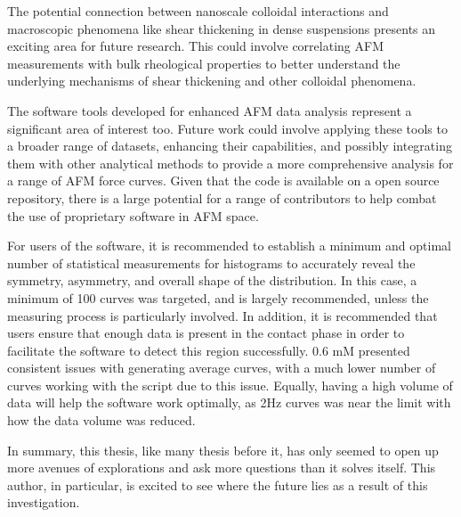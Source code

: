 The potential connection between nanoscale colloidal interactions and macroscopic phenomena like shear thickening in dense suspensions presents an exciting area for future research. This could involve correlating AFM measurements with bulk rheological properties to better understand the underlying mechanisms of shear thickening and other colloidal phenomena.

The software tools developed for enhanced AFM data analysis represent a significant area of interest too. Future work could involve applying these tools to a broader range of datasets, enhancing their capabilities, and possibly integrating them with other analytical methods to provide a more comprehensive analysis for a range of AFM force curves. Given that the code is available on a open source repository, there is a large potential for a range of contributors to help combat the use of proprietary software in AFM space.

For users of the software, it is recommended to establish a minimum and optimal number of statistical measurements for histograms to accurately reveal the symmetry, asymmetry, and overall shape of the distribution. In this case, a minimum of 100 curves was targeted, and is largely recommended, unless the measuring process is particularly involved. In addition, it is recommended that users ensure that enough data is present in the contact phase in order to facilitate the software to detect this region successfully. 0.6 mM presented consistent issues with generating average curves, with a much lower number of curves working with the script due to this issue. Equally, having a high volume of data will help the software work optimally, as 2Hz curves was near the limit with how the data volume was reduced.

In summary, this thesis, like many thesis before it, has only seemed to open up more avenues of explorations and ask more questions than it solves itself. This author, in particular, is excited to see where the future lies as a result of this investigation.
